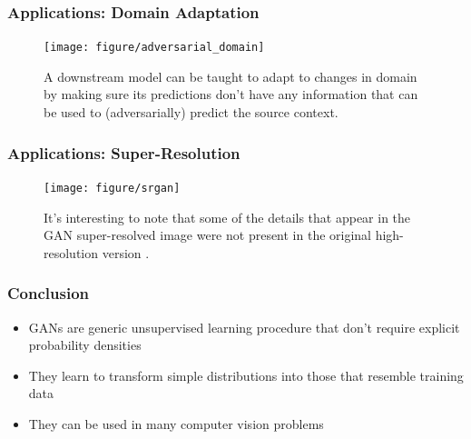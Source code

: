 \documentclass[10pt,mathserif]{beamer}
\begin{document}
\begin{frame}
  \frametitle{Applications: Domain Adaptation}
\begin{figure}[ht]
  \centering
  \texttt{[image: figure/adversarial\_domain]}
  \caption{A downstream model can be taught to adapt to changes in domain by
    making sure its predictions don't have any information that can be used to
    (adversarially) predict the source context. \citep{ganin2016domain}
    \label{fig:adapt} }
\end{figure}
\end{frame}

\begin{frame}
  \frametitle{Applications: Super-Resolution}
  \begin{figure}[ht]
  \centering
  \texttt{[image: figure/srgan]}
  \caption{It's interesting to note that some of the details that appear in the
    GAN super-resolved image were not present in the original high-resolution
    version \citep{ledig2017photo}.}
  \end{figure}
\end{frame}

\begin{frame}
  \frametitle{Conclusion}
  \begin{itemize}
    \item GANs are generic unsupervised learning procedure that don't require
      explicit probability densities
    \item They learn to transform simple distributions into those that resemble training data
    \item They can be used in many computer vision problems
  \end{itemize}
\end{frame}

\begin{frame}[allowframebreaks]
    
    
\end{frame}
\end{document}
